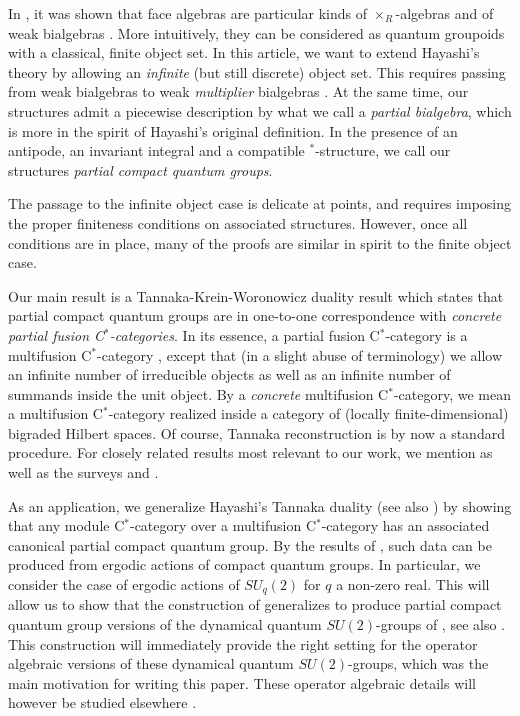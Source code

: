 \documentclass[10pt]{article}
\theoremstyle{definition}
\numberwithin{equation}{section}
\begin{document}
In \cite{Nil1,Sch1,Sch2}, it was shown that face algebras are particular kinds of $\times_R$-algebras \cite{Tak2} and of weak bialgebras \cite{Boh3}. More intuitively, they can be considered as quantum groupoids with a classical, finite object set. In this article, we want to extend Hayashi's theory by allowing an \emph{infinite} (but still discrete) object set. This requires passing from weak bialgebras to weak \emph{multiplier} bialgebras \cite{Boh1}. At the same time, our structures admit a piecewise description by what we call a \emph{partial bialgebra}, which is more in the spirit of Hayashi's original definition. In the presence of an antipode, an invariant integral and a compatible $^*$-structure, we call our structures \emph{partial compact quantum groups}. 

The passage to the infinite object case is delicate at points, and requires imposing the proper finiteness conditions on associated structures. However, once all conditions are in place, many of the proofs are similar in spirit to the finite object case. %

Our main result is a Tannaka-Krein-Woronowicz duality result which states that partial compact quantum groups are in one-to-one correspondence with \emph{concrete partial fusion C$^*$-categories}. In its essence, a partial fusion C$^*$-category is a multifusion C$^*$-category \cite{ENO1}, except that (in a slight abuse of terminology) we allow an infinite number of irreducible objects as well as an infinite number of summands inside the unit object. By a \emph{concrete} multifusion C$^*$-category, we mean a multifusion C$^*$-category realized inside a category of (locally finite-dimensional) bigraded Hilbert spaces. Of course, Tannaka reconstruction is by now a standard procedure. %
For closely related results most relevant to our work, we mention \cite{Wor2,Sch3,Hay8,Ost1,Hai1,Szl1,Pfe1,DCY1,Nes1} as well as the surveys \cite{JoS1} and \cite[Section 2.3]{NeT1}.

As an application, we generalize Hayashi's Tannaka duality \cite{Hay8} (see also \cite{Ost1}) by showing that any module C$^*$-category over a multifusion C$^*$-category has an associated canonical partial compact quantum group. By the results of \cite{DCY1}, such data can be produced from ergodic actions of compact quantum groups. In particular,  we consider the case of ergodic actions of $SU_q(2)$ for $q$ a non-zero real. This will allow us to show that the construction of \cite{Hay4} generalizes to produce partial compact quantum group versions of the dynamical quantum $SU(2)$-groups of \cite{EtV1,KoR1}, see also \cite{Sto1}. This construction will immediately provide the right setting for the operator algebraic versions of these dynamical quantum $SU(2)$-groups, which was the main motivation for writing this paper. These operator algebraic details will however be studied elsewhere \cite{DCT2}.
\end{document}
